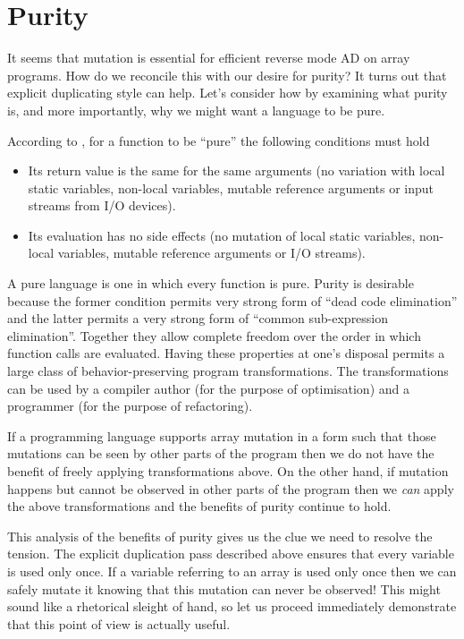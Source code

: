 \documentclass[12pt]{article}
\begin{document}
\section{Purity}

It seems that mutation is essential for efficient reverse mode AD on
array programs.  How do we reconcile this with our desire for purity?
It turns out that explicit duplicating style can help.  Let's consider
how by examining what purity is, and more importantly, why we might
want a language to be pure.

According to \cite{purity}, for a function to be ``pure'' the
following conditions must hold

\begin{itemize}
  \item
    Its return value is the same for the same arguments (no variation
    with local static variables, non-local variables, mutable
    reference arguments or input streams from I/O devices).

  \item
    Its evaluation has no side effects (no mutation of local
    static variables, non-local variables, mutable reference
    arguments or I/O streams).
\end{itemize}

A pure language is one in which every function is pure.  Purity is
desirable because the former condition permits very strong form of
``dead code elimination'' and the latter permits a very strong form of
``common sub-expression elimination''.  Together they allow complete
freedom over the order in which function calls are evaluated.  Having
these properties at one's disposal permits a large class of
behavior-preserving program transformations.  The transformations can
be used by a compiler author (for the purpose of optimisation) and a
programmer (for the purpose of refactoring).

If a programming language supports array mutation in a form such
that those mutations can be seen by other parts of the program then
we do not have the benefit of freely applying transformations above.
On the other hand, if mutation happens but cannot be observed in other
parts of the program then we \emph{can} apply the above
transformations and the benefits of purity continue to hold.

This analysis of the benefits of purity gives us the clue we need to
resolve the tension.  The explicit duplication pass described above
ensures that every variable is used only once.  If a variable
referring to an array is used only once then we can safely mutate it
knowing that this mutation can never be observed!  This might sound
like a rhetorical sleight of hand, so let us proceed immediately
demonstrate that this point of view is actually useful.
\end{document}
